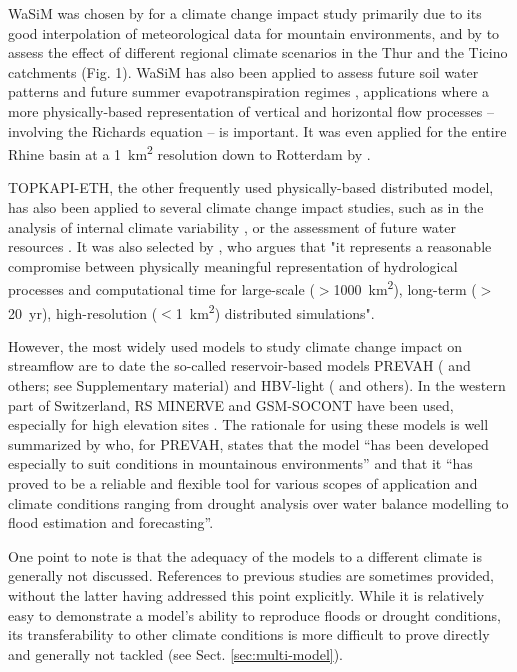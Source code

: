 \documentclass[10pt,a4paper]{article}
\begin{document}
WaSiM was chosen by \citet{Middelkoop2001} for a climate change impact study primarily due to its good interpolation of meteorological data for mountain environments, and by \citet{Jasper2004} to assess the effect of different regional climate scenarios in the Thur and the Ticino catchments (Fig. 1). WaSiM has also been applied to assess future soil water patterns \citep{Jasper2006, Rossler2012} and future summer evapotranspiration regimes \citep{Calanca2006}, applications where a more physically-based representation of vertical and horizontal flow processes -- involving the Richards equation -- is important. It was even applied for the entire Rhine basin at a 1~km\textsuperscript{2} resolution down to Rotterdam by \citet{Kleinn2005}.

TOPKAPI-ETH, the other frequently used physically-based distributed model, has also been applied to several climate change impact studies, such as in the analysis of internal climate variability \citep{Fatichi2014}, or the assessment of future water resources \citep{Finger2012}. It was also selected by \citet{Fatichi2015}, who argues that "it represents a reasonable compromise between physically meaningful representation of hydrological processes and computational time for large-scale ($>$1000~km\textsuperscript{2}), long-term ($>$20~yr), high-resolution ($<$1~km\textsuperscript{2}) distributed simulations".

However, the most widely used models to study climate change impact on streamflow are to date the so-called reservoir-based models PREVAH (\citealt{Koplin2012, Speich2015, Milano2015a, Brunner2019c} and others;  see Supplementary material) and HBV-light (\citealt{Etter2017, Hakala2020, Brunner2018a, Jenicek2018}  and others). In the western part of Switzerland, RS MINERVE and GSM-SOCONT have been used, especially for high elevation sites \citep{Horton2006, Uhlmann2013a, Uhlmann2013b, Terrier2015}. The rationale for using these models is well summarized by \citet{Koplin2010} who, for PREVAH, states that the model ``has been developed especially to suit conditions in mountainous environments'' and that it ``has proved to be a reliable and flexible tool for various scopes of application and climate conditions ranging from drought analysis over water balance modelling to flood estimation and forecasting''. 

One point to note is that the adequacy of the models to a different climate is generally not discussed. References to previous studies are sometimes provided, without the latter having addressed this point explicitly. While it is relatively easy to demonstrate a model's ability to reproduce floods or drought conditions, its transferability to other climate conditions is more difficult to prove directly and generally not tackled (see Sect. \ref{sec:multi-model}). 
\end{document}
